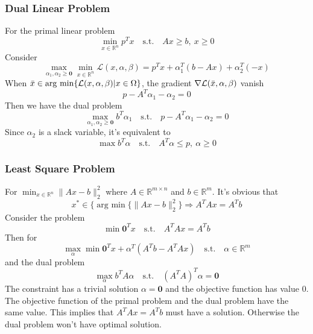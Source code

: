 \documentclass{article}
\DeclareMathOperator*{\argmin}{arg~min}
\begin{document}
            \subsubsection{Dual Linear Problem}
                For the primal linear problem
                \[
                    \min_{x\in\mathbb{R}^n}p^Tx\mathrm{\quad s.t.\quad}Ax\geq b,~x\geq 0
                \]
                Consider
                \[
                    \max_{\alpha_1,\alpha_2\geq \mathbf{0}}\min_{x\in\mathbb{R}^n}\mathcal{L}(x,\alpha,\beta)=p^Tx+\alpha_1^T(b-Ax)+\alpha_2^T(-x)
                \]
                When $\Bar{x}\in\mathrm{arg~min}\{\mathcal{L}(x,\alpha,\beta)|x\in\Omega\}$, the gradient $\nabla\mathcal{L}(\Bar{x},\alpha,\beta)$ vanish
                \[
                    p-A^T\alpha_1-\alpha_2=0
                \]
                Then we have the dual problem
                \[
                    \max_{\alpha_1,\alpha_2\geq \mathbf{0}}b^T\alpha_1\mathrm{\quad s.t. \quad}p-A^T\alpha_1-\alpha_2=0
                \]
                Since $\alpha_2$ is a slack variable, it's equivalent to
                \[
                    \max b^T\alpha\mathrm{\quad s.t. \quad}A^T\alpha\leq p,~\alpha\geq 0
                \]
            \subsubsection{Least Square Problem}
                For $\min_{x\in\mathbb{R}^n}\|Ax-b\|_2^2$ where $A\in\mathbb{R}^{m\times n}$ and $b\in\mathbb{R}^m$. It's obvious that
                \[
                    x^*\in\big\{ \argmin\{\|Ax-b\|_2^2 \big\}\Rightarrow A^TAx = A^Tb
                \]
                Consider the problem
                \[
                    \min \mathbf{0}^Tx\mathrm{\quad s.t. \quad}A^TAx=A^Tb
                \]
                Then for
                \[
                    \max_{\alpha}\min \mathbf{0}^Tx+\alpha^T(A^Tb-A^TAx)\mathrm{\quad s.t. \quad}\alpha\in\mathbb{R}^m
                \]
                and the dual problem
                \[
                    \max_{\alpha} b^T A \alpha \mathrm{\quad s.t. \quad} (A^TA)^T\alpha=\mathbf{0}
                \]
                The constraint has a trivial solution $\alpha=\mathbf{0}$ and the objective function has value $0$. The objective function of the primal problem and the dual problem have the same value. This implies that $A^TAx=A^Tb$ must have a solution. Otherwise the dual problem won't have optimal solution.
\end{document}
